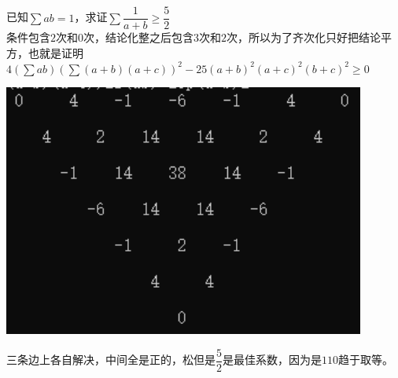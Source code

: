 \documentclass[UTF8]{ctexart}
\begin{document}
\subsection{}
已知$ \displaystyle \sum ab=1$，求证$ \displaystyle \sum \dfrac{1}{a+b}\geq \dfrac{5}{2}$\\
条件包含$ 2 $次和$ 0 $次，结论化整之后包含$ 3 $次和$ 2 $次，所以为了齐次化只好把结论平方，也就是证明$
4(\displaystyle \sum ab)(\displaystyle \sum (a+b)(a+c))^{2}-25(a+b)^{2}(a+c)^{2}(b+c)^{2}\ge 0 $
\begin{center}
	\includegraphics[width=0.5\linewidth]{a20}
\end{center}
三条边上各自解决，中间全是正的，松但是$ \dfrac{5}{2} $是最佳系数，因为是$ 110 $趋于取等。
\end{document}
